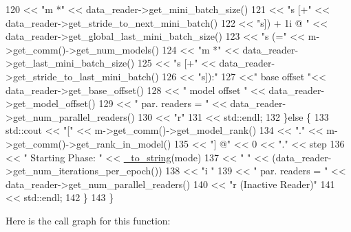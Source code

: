 \begin{DoxyCode}
120               << \textcolor{stringliteral}{"m *"} << data\_reader->get\_mini\_batch\_size()
121               << \textcolor{stringliteral}{"s [+"} << data\_reader->get\_stride\_to\_next\_mini\_batch()
122               << \textcolor{stringliteral}{"s]) + 1i @ "} << data\_reader->get\_global\_last\_mini\_batch\_size()
123               << \textcolor{stringliteral}{"s (="} << m->get\_comm()->get\_num\_models()
124               << \textcolor{stringliteral}{"m *"} << data\_reader->get\_last\_mini\_batch\_size()
125               << \textcolor{stringliteral}{"s [+"} << data\_reader->get\_stride\_to\_last\_mini\_batch()
126               << \textcolor{stringliteral}{"s]):"}
127               <<\textcolor{stringliteral}{" base offset "}<< data\_reader->get\_base\_offset()
128               << \textcolor{stringliteral}{" model offset "} << data\_reader->get\_model\_offset()
129               << \textcolor{stringliteral}{" par. readers = "} << data\_reader->get\_num\_parallel\_readers()
130               << \textcolor{stringliteral}{"r"}
131               << std::endl;
132   \}\textcolor{keywordflow}{else} \{
133     std::cout << \textcolor{stringliteral}{"["} << m->get\_comm()->get\_model\_rank()
134               << \textcolor{stringliteral}{"."} << m->get\_comm()->get\_rank\_in\_model()
135               << \textcolor{stringliteral}{"] @"} << 0 << \textcolor{stringliteral}{"."} << step
136               << \textcolor{stringliteral}{" Starting Phase: "} << \hyperlink{base_8hpp_adeeaddd10bd31df0cae7cb0fcae45d5c}{\_to\_string}(mode)
137               << \textcolor{stringliteral}{" "} << (data\_reader->get\_num\_iterations\_per\_epoch())
138               << \textcolor{stringliteral}{"i "}
139               << \textcolor{stringliteral}{" par. readers = "} << data\_reader->get\_num\_parallel\_readers()
140               << \textcolor{stringliteral}{"r (Inactive Reader)"}
141               << std::endl;
142   \}
143 \}
\end{DoxyCode}
Here is the call graph for this function\+:\nopagebreak
